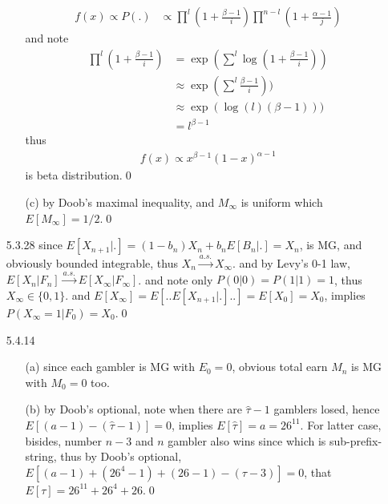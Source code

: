 \documentclass[paper=a4, fontsize=11pt]{scrartcl} %
\numberwithin{equation}{section} %
\numberwithin{figure}{section} %
\numberwithin{table}{section} %
\begin{document}
\begin{itemize}
\begin{itemize}
		\begin{align}
			f(x)\propto P(.)&\propto \prod^l (1+\frac{\beta-1}{i})\prod^{n-l} (1+\frac{\alpha-1}{j})
		\end{align}
		and note 
		\begin{align}
			\prod^l (1+\frac{\beta-1}{i}) &= \exp(\sum^l \log (1+\frac{\beta-1}{i}))\\
			&\approx \exp(\sum^l \frac{\beta-1}{i}))\\
			&\approx \exp(\log(l)(\beta-1)))\\
			&= l^{\beta-1}
		\end{align}
		thus
		\begin{align}
			f(x) \propto x^{\beta-1}(1-x)^{\alpha-1}
		\end{align}
		is beta distribution.\qed
		\item[(c)] by Doob's maximal inequality, and $M_{\infty}$ is uniform which $E[M_{\infty}]=1/2$.\qed
	\end{itemize}
	\item[5.3.28] since $E[X_{n+1}|.]= (1-b_n)X_n + b_nE[B_n|.]= X_n$, is MG, and obviously bounded integrable, thus $X_n\stackrel{a.s.}{\rightarrow} X_{\infty}$. and by Levy's 0-1 law, $E[X_n|F_n]\stackrel{a.s.}{\rightarrow} E[X_\infty|F_\infty]$. and note only $P(0|0)=P(1|1)=1$, thus $X_{\infty}\in \{0,1\}$. and $E[X_\infty]=E[..E[X_{n+1}|.]..] = E[X_0]=X_0$, implies $P(X_\infty=1|F_0)=X_0$.\qed
	\item[5.4.14]
	\begin{itemize}
		\item[(a)] since each gambler is MG with $E_0=0$, obvious total earn $M_n$ is MG with $M_0=0$ too.
		\item[(b)] by Doob's optional, note when there are $\hat{\tau}-1$ gamblers losed, hence $E[(a-1) - (\hat{\tau}-1)]=0$, implies $E[\hat{\tau}]=a=26^{11}$. For latter case, bisides, number $n-3$ and $n$ gambler also wins since which is sub-prefix-string, thus by Doob's optional, $E[(a-1)+ (26^4-1)+(26-1) - (\tau-3)]=0$, that $E[\tau]=26^{11}+26^4+26$.\qed
	\end{itemize}
\end{itemize}
\end{document}
